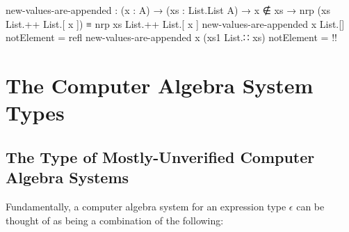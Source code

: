 \documentclass{report}
\begin{document}
\begin{code}
  new-values-are-appended :
    (x : A) →
    (xs : List.List A) →
    x ∉ xs →
    nrp (xs List.++ List.[ x ]) ≡ nrp xs List.++ List.[ x ]
  new-values-are-appended x List.[] notElement = refl
  new-values-are-appended x (xs1 List.∷ xs) notElement = {!!}
\end{code}

\chapter{The Computer Algebra System Types}

\section{The Type of Mostly-Unverified Computer Algebra Systems}
Fundamentally, a computer algebra system for an expression type \(\epsilon\) can be thought of as being a combination of the following:
\end{document}
